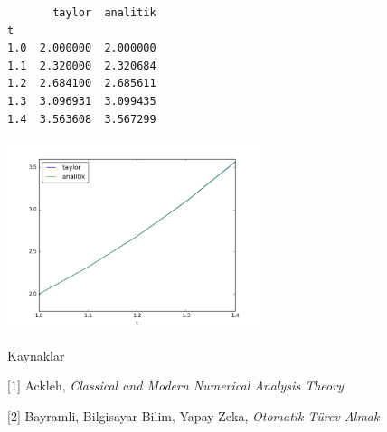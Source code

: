 \documentclass[12pt,fleqn]{article}\usepackage{../../common}
\begin{document}
\begin{verbatim}
       taylor  analitik
t                      
1.0  2.000000  2.000000
1.1  2.320000  2.320684
1.2  2.684100  2.685611
1.3  3.096931  3.099435
1.4  3.563608  3.567299
\end{verbatim}


\includegraphics[width=20em]{2_7.png}


Kaynaklar 

[1] Ackleh, {\em Classical and Modern Numerical Analysis Theory}

[2] Bayramli, Bilgisayar Bilim, Yapay Zeka, {\em Otomatik Türev Almak}
\end{document}

